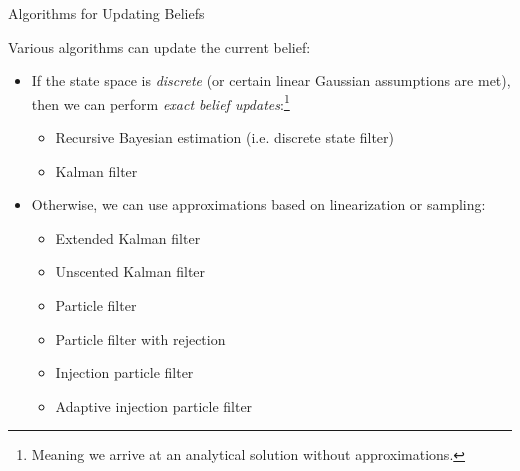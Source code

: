 
\begin{frame}{Algorithms for Updating Beliefs}

Various algorithms can update the current belief:
\begin{itemize}
    \item If the state space is \textit{discrete} (or certain linear Gaussian assumptions are met), then we can perform \textit{exact belief updates}:\footnote{Meaning we arrive at an analytical solution without approximations.}
    \begin{itemize}
        \item Recursive Bayesian estimation (i.e. discrete state filter)
        \item Kalman filter
    \end{itemize}
    \item Otherwise, we can use approximations based on linearization or sampling:
    \begin{itemize}
        \item Extended Kalman filter
        \item Unscented Kalman filter
        \item Particle filter
        \item Particle filter with rejection
        \item Injection particle filter
        \item Adaptive injection particle filter
    \end{itemize}
\end{itemize}

\end{frame}